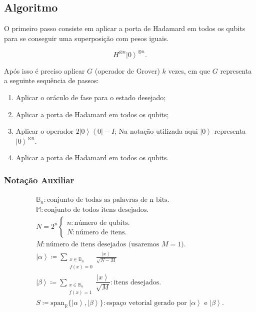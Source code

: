 \subsection{Algoritmo}\label{subsec:algoritmo}

O primeiro passo consiste em aplicar a porta de Hadamard em todos os
qubits para se conseguir uma superposição com pesos iguais.

\[H^{\otimes n}\left|0\right\rangle^{\otimes n}.\]

Após isso é preciso aplicar \(G\) (operador de Grover) \(k\) vezes, em que \(G\)
representa a seguinte sequência de passos:

\begin{enumerate}
\def\labelenumi{\arabic{enumi}.}
\item
  Aplicar o oráculo de fase para o estado desejado;
\item
  Aplicar a porta de Hadamard em todos os qubits;
\item
  Aplicar o operador \(2 \left| 0 \right\rangle \left\langle 0 \right| - I\);
  Na notação utilizada aqui \(\left| 0 \right\rangle\) representa \(\left| 0 \right\rangle^{\otimes n}\).
\item
  Aplicar a porta de Hadamard em todos os qubits.
\end{enumerate}

\subsubsection{Notação Auxiliar}\label{subsubsec:notacao-auxiliar}

\[\begin{aligned}
\begin{matrix}
\mathbb{B}_n: \text{conjunto de todas as palavras de n bits}. \\
\mathbb{M}: \text{conjunto de todos itens desejados}. \\
N = 2^n
\begin{cases}
n: \text{número de qubits}. \\
N: \text{número de itens}.
\end{cases} \\
M: \text{número de itens desejados (usaremos } M = 1). \\
\left| \alpha \right\rangle \coloneqq \displaystyle \sum_{\substack{x \in \mathbb{B}_n \\ f(x) = 0}} \frac{\left| x \right\rangle}{\sqrt{N - M}} \\
\left| \beta \right\rangle \coloneqq \displaystyle\sum_{\substack{x \in \mathbb{B}_n \\ f(x) = 1}} \dfrac{\left| x \right\rangle}{\sqrt{M}} : \text{itens desejados}. \\
S \coloneqq \text{span}_\mathbb{R}\{\left| \alpha \right\rangle, \left| \beta \right\rangle \} : \text{espaço vetorial gerado por } \left| \alpha \right\rangle \text{ e } \left| \beta \right\rangle.
\end{matrix}
\end{aligned}\]


